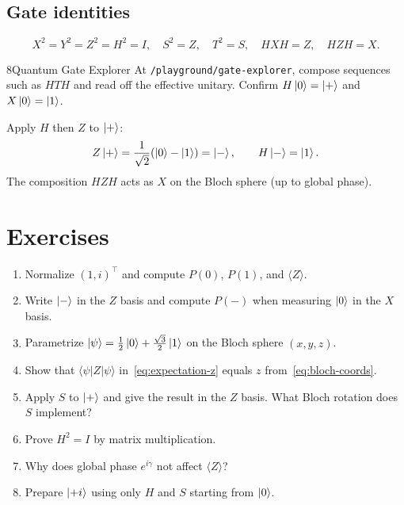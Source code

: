 \subsection{Gate identities}

\begin{equation}
X^2=Y^2=Z^2=H^2=I,\quad S^2=Z,\quad T^2=S,\quad HXH=Z,\quad HZH=X.
\label{eq:gate-identities}
\end{equation}

\begin{labbox}{8}{Quantum Gate Explorer}
At \texttt{/playground/gate-explorer}, compose sequences such as $HTH$ and read off the effective unitary. Confirm $H\ket{0}=\ket{+}$ and $X\ket{0}=\ket{1}$.
\end{labbox}

\begin{example}
Apply $H$ then $Z$ to $\ket{+}$:
\[
Z\ket{+} = \frac{1}{\sqrt{2}}(\ket{0}-\ket{1})=\ket{-},\qquad
H\ket{-}=\ket{1}.
\]
The composition $HZH$ acts as $X$ on the Bloch sphere (up to global phase).
\end{example}

\section*{Exercises}
\begin{enumerate}[label=\arabic*.]
\item Normalize $(1,i)^\top$ and compute $P(0)$, $P(1)$, and $\langle Z\rangle$.
\item Write $\ket{-}$ in the $Z$ basis and compute $P(-)$ when measuring $\ket{0}$ in the $X$ basis.
\item Parametrize $\ket{\psi}=\frac{1}{2}\ket{0}+\frac{\sqrt{3}}{2}\ket{1}$ on the Bloch sphere $(x,y,z)$.
\item Show that $\langle\psi|Z|\psi\rangle$ in~\eqref{eq:expectation-z} equals $z$ from~\eqref{eq:bloch-coords}.
\item Apply $S$ to $\ket{+}$ and give the result in the $Z$ basis. What Bloch rotation does $S$ implement?
\item Prove $H^2=I$ by matrix multiplication.
\item Why does global phase $e^{i\gamma}$ not affect $\langle Z\rangle$?
\item Prepare $\ket{+i}$ using only $H$ and $S$ starting from $\ket{0}$.
\end{enumerate}
